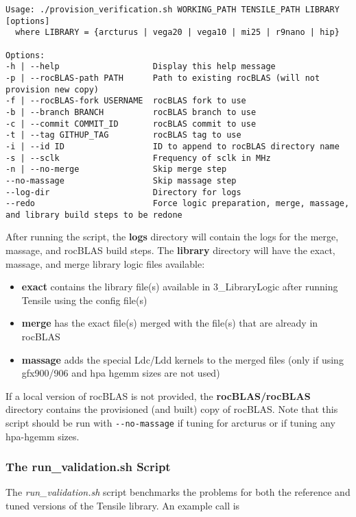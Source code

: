 \documentclass[]{article}
\begin{document}
\begin{lstlisting}
Usage: ./provision_verification.sh WORKING_PATH TENSILE_PATH LIBRARY [options]
  where LIBRARY = {arcturus | vega20 | vega10 | mi25 | r9nano | hip}

Options:
-h | --help                   Display this help message
-p | --rocBLAS-path PATH      Path to existing rocBLAS (will not provision new copy)
-f | --rocBLAS-fork USERNAME  rocBLAS fork to use
-b | --branch BRANCH          rocBLAS branch to use
-c | --commit COMMIT_ID       rocBLAS commit to use
-t | --tag GITHUP_TAG         rocBLAS tag to use
-i | --id ID                  ID to append to rocBLAS directory name
-s | --sclk                   Frequency of sclk in MHz
-n | --no-merge               Skip merge step
--no-massage                  Skip massage step
--log-dir                     Directory for logs
--redo                        Force logic preparation, merge, massage, and library build steps to be redone
\end{lstlisting}

After running the script, the \textbf{logs} directory will contain the logs for the merge, massage, and rocBLAS build steps. The \textbf{library} directory will have the exact, massage, and merge library logic files available:

\begin{itemize}
	\item \textbf{exact} contains the library file(s) available in 3\_LibraryLogic after running Tensile using the config file(s)
	\item \textbf{merge} has the exact file(s) merged with the file(s) that are already in rocBLAS
	\item \textbf{massage} adds the special Ldc/Ldd kernels to the merged files (only if using gfx900/906 and hpa hgemm sizes are not used)
\end{itemize}

\noindent
If a local version of rocBLAS is not provided, the \textbf{rocBLAS/rocBLAS} directory contains the provisioned (and built) copy of rocBLAS. Note that this script should be run with \lstinline{--no-massage} if tuning for arcturus or if tuning any hpa-hgemm sizes.

\subsubsection{The run\_validation.sh Script}

The \emph{run\_validation.sh} script benchmarks the problems for both the reference and tuned versions of the Tensile library. An example call is
\end{document}
